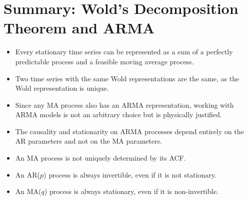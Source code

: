 \section{Summary: Wold's Decomposition Theorem and ARMA}
\begin{itemize}
    \item Every stationary time series can be represented as a sum of a perfectly predictable process and a feasible moving average process.
    \item Two time series with the same Wold representations are the same, as the Wold representation is unique.
    \item Since any MA process also has an ARMA representation, working with ARMA models is not an arbitrary choice but is physically justified.
    \item The causality and stationarity on ARMA processes depend entirely on the AR parameters and not on the MA parameters.
    \item An MA process is not uniquely determined by its ACF.
    \item An AR(\(p\)) process is always invertible, even if it is not stationary.
    \item An MA(\(q\)) process is always stationary, even if it is non-invertible.
\end{itemize}